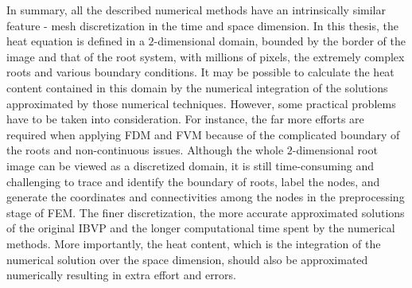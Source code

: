 In summary, all the described numerical methods have an intrinsically
similar feature - mesh discretization in the time and space
dimension. In this thesis, the heat equation is defined in a
$2$-dimensional domain, bounded by the border of the image and that of
the root system, with millions of pixels, the extremely complex roots
and various boundary conditions. It may be possible to calculate the
heat content contained in this domain by the numerical integration of
the solutions approximated by those numerical techniques. However,
some practical problems have to be taken into consideration. For
instance, the far more efforts are required when applying FDM and FVM
because of the complicated boundary of the roots and non-continuous
issues. Although the whole $2$-dimensional root image can be viewed as
a discretized domain, it is still time-consuming and challenging to
trace and identify the boundary of roots, label the nodes, and
generate the coordinates and connectivities among the nodes in the
preprocessing stage of FEM. The finer discretization, the more
accurate approximated solutions of the original IBVP and the longer
computational time spent by the numerical methods. More importantly,
the heat content, which is the integration of the numerical solution
over the space dimension, should also be approximated numerically
resulting in extra effort and errors.





